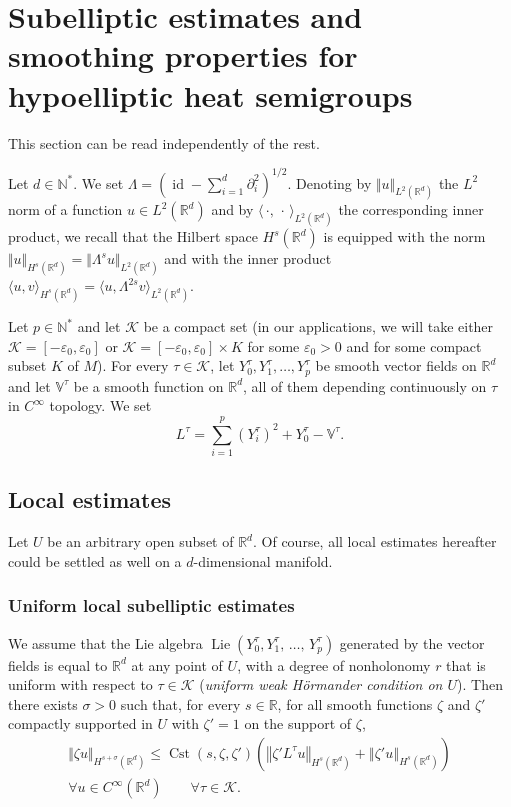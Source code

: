 \documentclass[AHL,Unicode,published]{cedram}
\newcommand*\R{\mathbb{R}}
\newcommand*\N{\mathbb{N}}
\newcommand{\bbV}{\mathbb{V}}
\newcommand{\calK}{\mathcal{K}}
\DeclareMathOperator{\Cst}{Cst}
\DeclareMathOperator{\Lie}{Lie}
\DeclareMathOperator{\id}{id}
\renewcommand{\leq}{\leqslant}
\let\oldforall\forall
\renewcommand*{\forall}{\mathrel{\oldforall}}
\begin{document}
\section{Subelliptic estimates and smoothing properties for hypoelliptic heat semigroups}\label{sec:uniform_subelliptic_estimates}
This section can be read independently of the rest.

Let $d\in\N^*$. We set $\Lambda = (\id-\sum_{i=1}^d \partial_i^2)^{1/2}$. Denoting by $\Vert u\Vert_{L^2(\R^d)}$ the $L^2$ norm of a function $u\in L^2(\R^d)$ and by $\langle\,\cdot,\,\cdot\,\rangle_{L^2(\R^d)}$ the corresponding inner product, we recall that the Hilbert space $H^s(\R^d)$ is equipped with the norm $\Vert u\Vert_{H^s(\R^d)} = \Vert \Lambda^s u\Vert_{L^2(\R^d)}$ and with the inner product $\langle u,v\rangle_{H^s(\R^d)} = \langle u,\Lambda^{2s}v\rangle_{L^2(\R^d)}$.

Let $p\in\N^*$ and let $\calK$ be a compact set (in our applications, we will take either $\calK=[-\varepsilon_0,\varepsilon_0]$ or $\calK=[-\varepsilon_0,\varepsilon_0]\times K$ for some $\varepsilon_0>0$ and for some compact subset $K$ of $M$). For every $\tau\in\calK$, let $Y_0^\tau,Y_1^\tau,\ldots,Y_p^\tau$ be smooth vector fields on $\R^d$ and let $\bbV^\tau$ be a smooth function on $\R^d$, all of them depending continuously on $\tau$ in $C^\infty$ topology. We set
\begin{equation}\label{def_Ltau}
L^\tau = \sum_{i=1}^p \left(Y_i^\tau\right)^2 + Y_0^\tau - \bbV^\tau.
\end{equation}


\subsection{Local estimates}\label{sec:local_estimates}
Let $U$ be an arbitrary open subset of $\R^d$. Of course, all local estimates hereafter could be settled as well on a $d$-dimensional manifold.

\subsubsection{Uniform local subelliptic estimates}\label{sec:uniform_local_subelliptic_estimates}

\begin{theo}\label{thm_subelliptic_uniform}
We assume that the Lie algebra $\Lie(Y_0^\tau,Y_1^\tau,\,\ldots,\,Y_p^\tau)$ generated by the vector fields is equal to $\R^d$ at any point of $U$, with a degree of nonholonomy $r$ that is uniform with respect to $\tau\in\calK$ (\emph{uniform weak H\"ormander condition on $U$}). Then there exists $\sigma>0$ such that, for every $s\in\R$, for all smooth functions $\zeta$ and $\zeta'$ compactly supported in $U$ with $\zeta'=1$ on the support of $\zeta$,
\begin{multline*}
\Vert \zeta u\Vert_{H^{s+\sigma}(\R^d)} \leq \Cst\left(s,\zeta,\zeta'\right) \left(\left\Vert \zeta' L^\tau u\right\Vert_{H^s(\R^d)} + \left\Vert \zeta' u \right\Vert_{H^s\left(\R^d\right)} \right) \\
\forall u\in C^\infty\left(\R^d\right)\qquad \forall \tau\in\calK.
\end{multline*}
\end{theo}
\end{document}
